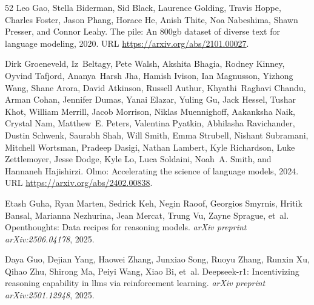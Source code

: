 \begin{thebibliography}{52}
Leo Gao, Stella Biderman, Sid Black, Laurence Golding, Travis Hoppe, Charles Foster, Jason Phang, Horace He, Anish Thite, Noa Nabeshima, Shawn Presser, and Connor Leahy.
\newblock The pile: An 800gb dataset of diverse text for language modeling, 2020.
\newblock URL \url{https://arxiv.org/abs/2101.00027}.

Dirk Groeneveld, Iz~Beltagy, Pete Walsh, Akshita Bhagia, Rodney Kinney, Oyvind Tafjord, Ananya~Harsh Jha, Hamish Ivison, Ian Magnusson, Yizhong Wang, Shane Arora, David Atkinson, Russell Authur, Khyathi~Raghavi Chandu, Arman Cohan, Jennifer Dumas, Yanai Elazar, Yuling Gu, Jack Hessel, Tushar Khot, William Merrill, Jacob Morrison, Niklas Muennighoff, Aakanksha Naik, Crystal Nam, Matthew~E. Peters, Valentina Pyatkin, Abhilasha Ravichander, Dustin Schwenk, Saurabh Shah, Will Smith, Emma Strubell, Nishant Subramani, Mitchell Wortsman, Pradeep Dasigi, Nathan Lambert, Kyle Richardson, Luke Zettlemoyer, Jesse Dodge, Kyle Lo, Luca Soldaini, Noah~A. Smith, and Hannaneh Hajishirzi.
\newblock Olmo: Accelerating the science of language models, 2024.
\newblock URL \url{https://arxiv.org/abs/2402.00838}.

Etash Guha, Ryan Marten, Sedrick Keh, Negin Raoof, Georgios Smyrnis, Hritik Bansal, Marianna Nezhurina, Jean Mercat, Trung Vu, Zayne Sprague, et~al.
\newblock Openthoughts: Data recipes for reasoning models.
\newblock \emph{arXiv preprint arXiv:2506.04178}, 2025.

Daya Guo, Dejian Yang, Haowei Zhang, Junxiao Song, Ruoyu Zhang, Runxin Xu, Qihao Zhu, Shirong Ma, Peiyi Wang, Xiao Bi, et~al.
\newblock Deepseek-r1: Incentivizing reasoning capability in llms via reinforcement learning.
\newblock \emph{arXiv preprint arXiv:2501.12948}, 2025.


\end{thebibliography}
